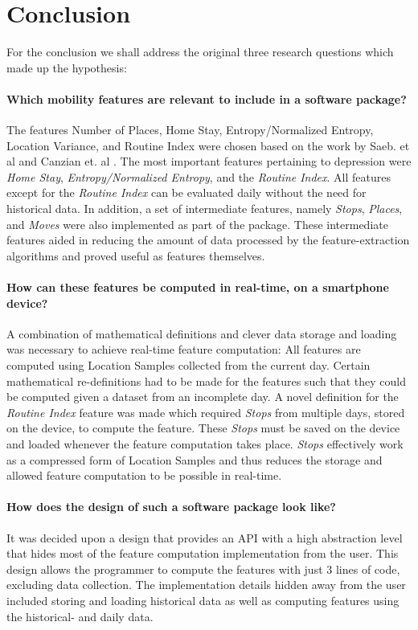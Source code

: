 \chapter{Conclusion}
\label{chapter:08}

For the conclusion we shall address the original three research questions which made up the hypothesis:

\subsubsection*{Which mobility features are relevant to include in a software package?}
The features Number of Places, Home Stay, Entropy/Normalized Entropy, Location Variance, and Routine Index were chosen based on the work by Saeb. et al \cite{Saeb2015} and Canzian et. al \cite{Canzian2015}. The most important features pertaining to depression were \textit{Home Stay}, \textit{Entropy/Normalized Entropy}, and the \textit{Routine Index}. All features except for the \textit{Routine Index} can be evaluated daily without the need for historical data. In addition, a set of intermediate features, namely \textit{Stops}, \textit{Places}, and \textit{Moves} were also implemented as part of the package. These intermediate features aided in reducing the amount of data processed by the feature-extraction algorithms and proved useful as features themselves.

\subsubsection*{How can these features be computed in real-time, on a smartphone device?}
A combination of mathematical definitions and clever data storage and loading was necessary to achieve real-time feature computation: All features are computed using Location Samples collected from the current day. Certain mathematical re-definitions had to be made for the features such that they could be computed given a dataset from an incomplete day. A novel definition for the \textit{Routine Index} feature was made which required \textit{Stops} from multiple days, stored on the device, to compute the feature. These \textit{Stops} must be saved on the device and loaded whenever the feature computation takes place. \textit{Stops} effectively work as a compressed form of Location Samples and thus reduces the storage and allowed feature computation to be possible in real-time.

\subsubsection*{How does the design of such a software package look like?}
It was decided upon a design that provides an API with a high abstraction level that hides most of the feature computation implementation from the user. This design allows the programmer to compute the features with just 3 lines of code, excluding data collection. The implementation details hidden away from the user included storing and loading historical data as well as computing features using the historical- and daily data. 

